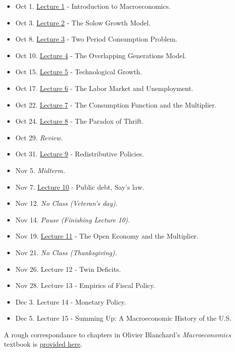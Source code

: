\documentclass[]{book}
\providecommand{\tightlist}{%
  \setlength{\itemsep}{0pt}\setlength{\parskip}{0pt}}
\theoremstyle{definition}
\theoremstyle{definition}
\theoremstyle{definition}
\theoremstyle{remark}
\begin{document}
\begin{itemize}
\tightlist
\item
  Oct 1. \protect\hyperlink{intro-cobb}{Lecture 1} - Introduction to
  Macroeconomics.
\item
  Oct 3. \protect\hyperlink{solow}{Lecture 2} - The Solow Growth Model.
\item
  Oct 8. \protect\hyperlink{two-period}{Lecture 3} - Two Period
  Consumption Problem.
\item
  Oct 10. \protect\hyperlink{olg}{Lecture 4} - The Overlapping
  Generations Model.
\item
  Oct 15. \protect\hyperlink{technology}{Lecture 5} - Technological
  Growth.
\item
  Oct 17. \protect\hyperlink{labor-market}{Lecture 6} - The Labor Market
  and Unemployment.
\item
  Oct 22. \protect\hyperlink{cons-function}{Lecture 7} - The Consumption
  Function and the Multiplier.
\item
  Oct 24. \protect\hyperlink{paradox-thrift}{Lecture 8} - The Paradox of
  Thrift.
\item
  Oct 29. \emph{Review.}
\item
  Oct 31. \protect\hyperlink{redistributive}{Lecture 9} - Redistributive
  Policies.
\item
  Nov 5. \emph{Midterm.}
\item
  Nov 7. \protect\hyperlink{public-debt}{Lecture 10} - Public debt,
  Say's law.
\item
  Nov 12. \emph{No Class (Veteran's day).}
\item
  Nov 14. \emph{Pause (Finishing Lecture 10).}
\item
  Nov 19. \protect\hyperlink{open}{Lecture 11} - The Open Economy and
  the Multiplier.
\item
  Nov 21. \emph{No Class (Thanksgiving).}
\item
  Nov 26. Lecture 12 - Twin Deficits.
\item
  Nov 28. Lecture 13 - Empirics of Fiscal Policy.
\item
  Dec 3. Lecture 14 - Monetary Policy.
\item
  Dec 5. Lecture 15 - Summing Up: A Macroeconomic History of the U.S.
\end{itemize}

A rough correspondance to chapters in Olivier Blanchard's
\emph{Macroeconomics} textbook is
\href{https://docs.google.com/spreadsheets/d/1OQzilQvOLusOsv16pJ3FgFN1YAadELe64jJAV2PEsF0/edit?usp=sharing}{provided
here}.
\end{document}
